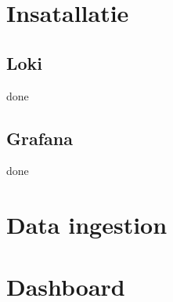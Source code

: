 \section{Insatallatie}

\subsection{Loki}
done
\subsection{Grafana}
done

\section{Data ingestion}

\section{Dashboard}